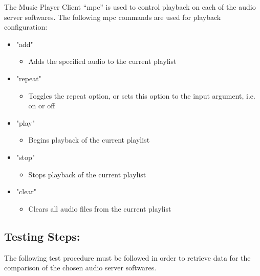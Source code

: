 \documentclass[11pt,a4paper,headinclude=false,footinclude=false]{scrreprt}
\begin{document}
The Music Player Client ``mpc'' is used to control playback on each of
the audio server softwares. The following mpc commands are used for
playback configuration:

\begin{itemize}
 \item "add"
 \begin{itemize}
  \item Adds the specified audio to the current playlist
 \end{itemize}
 \item "repeat"
 \begin{itemize}
  \item Toggles the repeat option, or sets this option to the input argument, i.e. on
   or off
  \end{itemize}
 \item "play"
 \begin{itemize}
  \item Begins playback of the current playlist
 \end{itemize}
 \item "stop"
 \begin{itemize}
  \item Stops playback of the current playlist
 \end{itemize}
 \item "clear"
 \begin{itemize}
  \item Clears all audio files from the current playlist
 \end{itemize}
\end{itemize}

\subsection{Testing Steps:}\label{testing-steps}

The following test procedure must be followed in order to retrieve data
for the comparison of the chosen audio server softwares.
\end{document}
